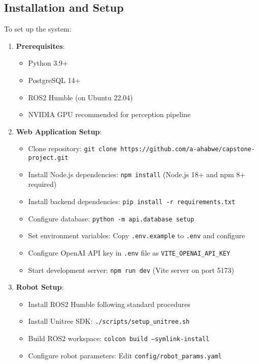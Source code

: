 \documentclass[12pt]{article}
\begin{document}
\subsection{Installation and Setup}

To set up the system:

\begin{enumerate}
    \item \textbf{Prerequisites}:
    \begin{itemize}
        \item Python 3.9+
        \item PostgreSQL 14+
        \item ROS2 Humble (on Ubuntu 22.04)
        \item NVIDIA GPU recommended for perception pipeline
    \end{itemize}
    
    \item \textbf{Web Application Setup}:
    \begin{itemize}
        \item Clone repository: \texttt{git clone https://github.com/a-ahabwe/capstone-project.git}
        \item Install Node.js dependencies: \texttt{npm install} (Node.js 18+ and npm 8+ required)
        \item Install backend dependencies: \texttt{pip install -r requirements.txt}
        \item Configure database: \texttt{python -m api.database setup}
        \item Set environment variables: Copy \texttt{.env.example} to \texttt{.env} and configure
        \item Configure OpenAI API key in \texttt{.env} file as \texttt{VITE\_OPENAI\_API\_KEY}
        \item Start development server: \texttt{npm run dev} (Vite server on port 5173)
    \end{itemize}
    
    \item \textbf{Robot Setup}:
    \begin{itemize}
        \item Install ROS2 Humble following standard procedures
        \item Install Unitree SDK: \texttt{./scripts/setup\_unitree.sh}
        \item Build ROS2 workspace: \texttt{colcon build --symlink-install}
        \item Configure robot parameters: Edit \texttt{config/robot\_params.yaml}
    \end{itemize}
\end{enumerate}
\end{document}
